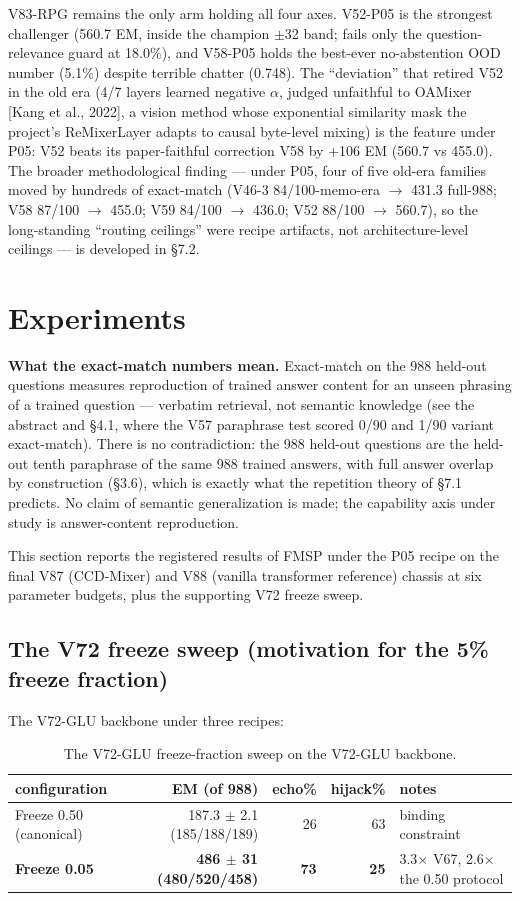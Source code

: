 \documentclass[11pt]{article}
\begin{document}
V83-RPG remains the only arm holding all four axes. V52-P05 is the strongest challenger (560.7 EM, inside the champion $\pm$32 band; fails only the question-relevance guard at 18.0\%), and V58-P05 holds the best-ever no-abstention OOD number (5.1\%) despite terrible chatter (0.748). The ``deviation'' that retired V52 in the old era (4/7 layers learned negative $\alpha$, judged unfaithful to OAMixer [Kang et al., 2022], a vision method whose exponential similarity mask the project's ReMixerLayer adapts to causal byte-level mixing) is the feature under P05: V52 beats its paper-faithful correction V58 by +106 EM (560.7 vs 455.0). The broader methodological finding --- under P05, four of five old-era families moved by hundreds of exact-match (V46-3 84/100-memo-era $\to$ 431.3 full-988; V58 87/100 $\to$ 455.0; V59 84/100 $\to$ 436.0; V52 88/100 $\to$ 560.7), so the long-standing ``routing ceilings'' were recipe artifacts, not architecture-level ceilings --- is developed in \S7.2.

\section{Experiments}

\textbf{What the exact-match numbers mean.} Exact-match on the 988 held-out questions measures reproduction of trained answer content for an unseen phrasing of a trained question --- verbatim retrieval, not semantic knowledge (see the abstract and \S4.1, where the V57 paraphrase test scored 0/90 and 1/90 variant exact-match). There is no contradiction: the 988 held-out questions are the held-out tenth paraphrase of the same 988 trained answers, with full answer overlap by construction (\S3.6), which is exactly what the repetition theory of \S7.1 predicts. No claim of semantic generalization is made; the capability axis under study is answer-content reproduction.

This section reports the registered results of FMSP under the P05 recipe on the final V87 (CCD-Mixer) and V88 (vanilla transformer reference) chassis at six parameter budgets, plus the supporting V72 freeze sweep.

\subsection{The V72 freeze sweep (motivation for the 5\% freeze fraction)}

The V72-GLU backbone under three recipes:

\begin{table}[!t]
\centering\small
\caption{The V72-GLU freeze-fraction sweep on the V72-GLU backbone.}
\label{tab:v72-sweep}
\begin{tabular}{lrrrl}
\toprule
configuration & EM (of 988) & echo\% & hijack\% & notes \\
\midrule
Freeze 0.50 (canonical) & 187.3 $\pm$ 2.1 (185/188/189) & 26 & 63 & binding constraint \\
\textbf{Freeze 0.05} & \textbf{486 $\pm$ 31 (480/520/458)} & \textbf{73} & \textbf{25} & 3.3$\times$ V67, 2.6$\times$ the 0.50 protocol \\
\bottomrule
\end{tabular}
\end{table}
\end{document}

